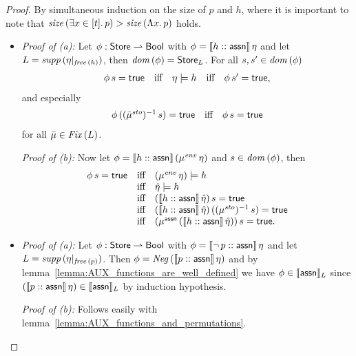 \documentclass[12pt,a4paper]{report}
\newcommand{\ssto}{\nstyle{sto}}
\newcommand{\senv}{\nstyle{env}}
\newcommand{\Fix}[1]{\nstyle{Fix}\,(#1)}
\newcommand{\Neg}{\nstyle{Neg}}
\begin{document}
\begin{proof}
  By simultaneous induction on the size of $p$ and $h$, where it is important to note that
  $\mathit{size}\,(\exists x \in [t].\,p) > \mathit{size}\,(\Lambda x.\,p)$ holds.
  \begin{itemize}
    \item {\em Proof of (a):}
          Let $\phi:\mathsf{Store} \rightharpoonup \mathsf{Bool}$ with $\phi = \llbracket{h}\mathrel{::}{\mathsf{assn}}\rrbracket\,\eta$
          and let $L = \mathit{supp}\,(\eta|_{\mathit{free}\,(h)})$,
          then $\mathit{dom}\,(\phi) = \mathsf{Store}_L$. For all $s,s'\in\mathit{dom}\,(\phi)$
          \[\begin{array}{rcccl}
            \phi\,s=\mathsf{true} &\text{iff}& \eta \models h &\text{iff}& \phi\,s'=\mathsf{true},
          \end{array}\]
          and especially
          \[\begin{array}{rcl}
            \phi\,((\bar{\mu}^\ssto)^{-1}\,s) = \true &\text{iff}& \phi\,s=\true
          \end{array}\]
          for all $\bar{\mu}\in\Fix{L}$.

          {\em Proof of (b):}
          Now let $\phi = \semantic{\tj{h}{\tassn}}\,(\mu^\senv\,\eta)$ and $s \in \mathit{dom}\,(\phi)$, then
          \[\begin{array}{rcl}
            \phi\,s = \true
            &\text{iff}& (\mu^\senv\,\eta) \models h \\
            &\text{iff}& \hat{\eta} \models h \\
            &\text{iff}& (\semantic{\tj{h}{\tassn}}\,\hat{\eta})\,s=\true \\
            &\text{iff}& (\semantic{\tj{h}{\tassn}}\,\hat{\eta})\,((\mu^\ssto)^{-1}\,s) = \true \\
            &\text{iff}& (\mu^\tassn\,(\semantic{\tj{h}{\tassn}}\,\hat{\eta}))\,s=\true.
          \end{array}\]

    \item {\em Proof of (a):}
          Let $\phi:\mathsf{Store} \rightharpoonup \mathsf{Bool}$ with $\phi = \llbracket{\neg\,p}\mathrel{::}{\mathsf{assn}}\rrbracket\,\eta$ and
          let $L = \mathit{supp}\,(\eta|_{\mathit{free}\,(p)})$. Then $\phi = \Neg\,(\semantic{\tj{p}{\tassn}}\,\eta)$ and
          by lemma~\ref{lemma:AUX_functions_are_well_defined} we have $\phi \in \llbracket\mathsf{assn}\rrbracket_L$
          since $(\llbracket{p}\mathrel{::}{\mathsf{assn}}\rrbracket\,\eta) \in \llbracket\mathsf{assn}\rrbracket_L$ by induction hypothesis.

          {\em Proof of (b):}
          Follows easily with lemma~\ref{lemma:AUX_functions_and_permutations}.


\end{itemize}
\end{proof}
\end{document}
